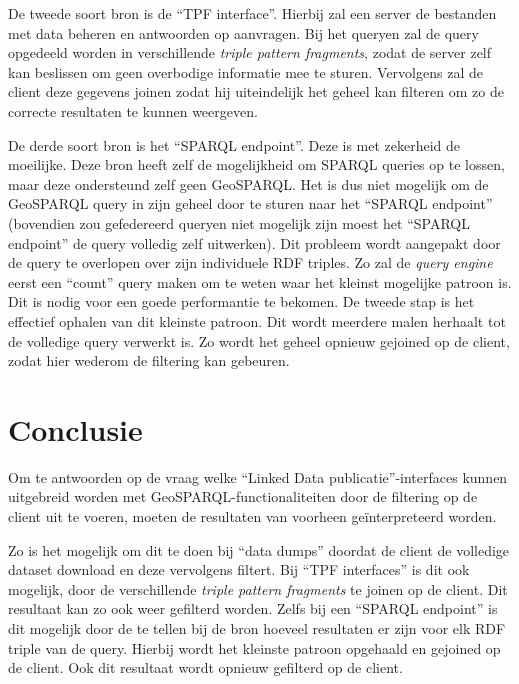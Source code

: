 \documentclass[twocolumn]{phdsymp} %
\begin{document}
De tweede soort bron is de ``TPF interface''. Hierbij zal een server de bestanden met data beheren en antwoorden op aanvragen. Bij het queryen zal de query opgedeeld worden in verschillende \textit{triple pattern fragments}, zodat de server zelf kan beslissen om geen overbodige informatie mee te sturen. Vervolgens zal de client deze gegevens joinen zodat hij uiteindelijk het geheel kan filteren om zo de correcte resultaten te kunnen weergeven.

De derde soort bron is het ``SPARQL endpoint''. Deze is met zekerheid de moeilijke. Deze bron heeft zelf de mogelijkheid om SPARQL queries op te lossen, maar deze ondersteund zelf geen GeoSPARQL. Het is dus niet mogelijk om de GeoSPARQL query in zijn geheel door te sturen naar het ``SPARQL endpoint'' (bovendien zou gefedereerd queryen niet mogelijk zijn moest het ``SPARQL endpoint'' de query volledig zelf uitwerken). Dit probleem wordt aangepakt door de query te overlopen over zijn individuele RDF triples. Zo zal de \textit{query engine} eerst een ``count'' query maken om te weten waar het kleinst mogelijke patroon is. Dit is nodig voor een goede performantie te bekomen. De tweede stap is het effectief ophalen van dit kleinste patroon. Dit wordt meerdere malen herhaalt tot de volledige query verwerkt is. Zo wordt het geheel opnieuw gejoined op de client, zodat hier wederom de filtering kan gebeuren.

\section{Conclusie}
Om te antwoorden op de vraag welke ``Linked Data publicatie''-interfaces kunnen uitgebreid worden met GeoSPARQL-functionaliteiten door de filtering op de client uit te voeren, moeten de resultaten van voorheen geïnterpreteerd worden. 

Zo is het mogelijk om dit te doen bij ``data dumps'' doordat de client de volledige dataset download en deze vervolgens filtert. Bij ``TPF interfaces'' is dit ook mogelijk, door de verschillende \textit{triple pattern fragments} te joinen op de client. Dit resultaat kan zo ook weer gefilterd worden. Zelfs bij een ``SPARQL endpoint'' is dit mogelijk door de te tellen bij de bron hoeveel resultaten er zijn voor elk RDF triple van de query. Hierbij wordt het kleinste patroon opgehaald en gejoined op de client. Ook dit resultaat wordt opnieuw gefilterd op de client. 



\end{document}
